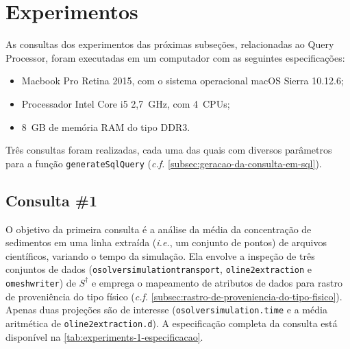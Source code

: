 
\section{Experimentos}

As consultas dos experimentos das próximas subseções, relacionadas ao Query Processor, foram executadas em um computador com as seguintes especificações:

\begin{itemize}
	\item Macbook Pro Retina 2015, com o sistema operacional macOS Sierra 10.12.6;
    \item Processador Intel Core i5 2,7~GHz, com 4~CPUs;
    \item 8~GB de memória RAM do tipo DDR3.
\end{itemize}

Três consultas foram realizadas, cada uma das quais com diversos parâmetros para a função \texttt{generateSqlQuery} (\textit{c.f.} \autoref{subsec:geracao-da-consulta-em-sql}).

\subsection{Consulta \#1}

%

%

O objetivo da primeira consulta é a análise da média da concentração de sedimentos em uma linha extraída (\textit{i.e.}, um conjunto de pontos) de arquivos científicos, variando o tempo da simulação. Ela envolve a inspeção de três conjuntos de dados (\texttt{osolversimulationtransport}, \texttt{oline2extraction} e \texttt{omeshwriter}) de \(S^{\dagger}\) e emprega o mapeamento de atributos de dados para rastro de proveniência do tipo físico (\textit{c.f.} \autoref{subsec:rastro-de-proveniencia-do-tipo-fisico}). Apenas duas projeções são de interesse (\texttt{osolversimulation.time} e a média aritmética de \texttt{oline2extraction.d}). A especificação completa da consulta está disponível na \autoref{tab:experiments-1-especificacao}.

